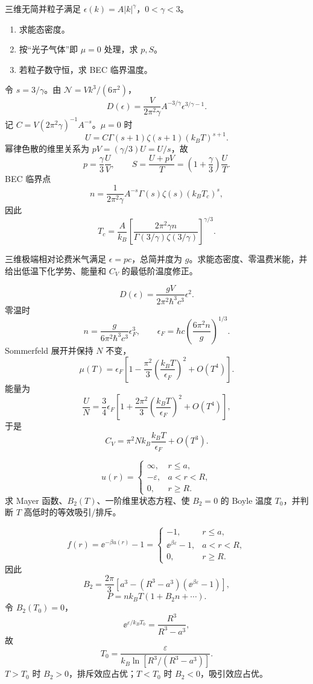 \begin{question}
三维无简并粒子满足 $\epsilon(k)=A|k|^\gamma$，$0<\gamma<3$。
\begin{enumerate}
\item 求能态密度。
\item 按“光子气体”即 $\mu=0$ 处理，求 $p,S$。
\item 若粒子数守恒，求 BEC 临界温度。
\end{enumerate}
\begin{solution}
令 $s=3/\gamma$。由 $\mathcal N=Vk^3/(6\pi^2)$，
\[\boxed{D(\epsilon)=\frac{V}{2\pi^2\gamma}A^{-3/\gamma}\epsilon^{3/\gamma-1}}.\]
记 $C=V(2\pi^2\gamma)^{-1}A^{-s}$。$\mu=0$ 时
\[U=C\Gamma(s+1)\zeta(s+1)(k_BT)^{s+1}.\]
幂律色散的维里关系为 $pV=(\gamma/3)U=U/s$，故
\[\boxed{p=\frac{\gamma}{3}\frac{U}{V}},\qquad \boxed{S=\frac{U+pV}{T}=\left(1+\frac{\gamma}{3}\right)\frac{U}{T}}.\]
BEC 临界点
\[n=\frac{1}{2\pi^2\gamma}A^{-s}\Gamma(s)\zeta(s)(k_BT_c)^s,\]
因此
\[\boxed{T_c=\frac{A}{k_B}\left[\frac{2\pi^2\gamma n}{\Gamma(3/\gamma)\zeta(3/\gamma)}\right]^{\gamma/3}}.\]
\end{solution}
\end{question}

\begin{question}
三维极端相对论费米气满足 $\epsilon=pc$，总简并度为 $g$。求能态密度、零温费米能，并给出低温下化学势、能量和 $C_V$ 的最低阶温度修正。
\begin{solution}
\[\boxed{D(\epsilon)=\frac{gV}{2\pi^2\hbar^3c^3}\epsilon^2}.\]
零温时
\[n=\frac{g}{6\pi^2\hbar^3c^3}\epsilon_F^3,\qquad \boxed{\epsilon_F=\hbar c\left(\frac{6\pi^2n}{g}\right)^{1/3}}.\]
Sommerfeld 展开并保持 $N$ 不变，
\[\boxed{\mu(T)=\epsilon_F\left[1-\frac{\pi^2}{3}\left(\frac{k_BT}{\epsilon_F}\right)^2+O(T^4)\right]}.\]
能量为
\[\boxed{\frac{U}{N}=\frac34\epsilon_F\left[1+\frac{2\pi^2}{3}\left(\frac{k_BT}{\epsilon_F}\right)^2+O(T^4)\right]},\]
于是
\[\boxed{C_V=\pi^2Nk_B\frac{k_BT}{\epsilon_F}+O(T^3)}.\]
\end{solution}
\end{question}

\begin{question}
\[u(r)=\begin{cases}\infty,&r\le a,\\-\varepsilon,&a<r<R,\\0,&r\ge R.\end{cases}\]
求 Mayer 函数、$B_2(T)$、一阶维里状态方程、使 $B_2=0$ 的 Boyle 温度 $T_0$，并判断 $T$ 高低时的等效吸引/排斥。
\begin{solution}
\[f(r)=\ee^{-\beta u(r)}-1=\begin{cases}-1,&r\le a,\\\ee^{\beta\varepsilon}-1,&a<r<R,\\0,&r\ge R.\end{cases}\]
因此
\[\boxed{B_2=\frac{2\pi}{3}\left[a^3-(R^3-a^3)(\ee^{\beta\varepsilon}-1)\right]},\]
\[\boxed{P=nk_BT(1+B_2n+\cdots)}.\]
令 $B_2(T_0)=0$，
\[\ee^{\varepsilon/k_BT_0}=\frac{R^3}{R^3-a^3},\]
故
\[\boxed{T_0=\frac{\varepsilon}{k_B\ln[R^3/(R^3-a^3)]}}.\]
$T>T_0$ 时 $B_2>0$，排斥效应占优；$T<T_0$ 时 $B_2<0$，吸引效应占优。
\end{solution}
\end{question}
